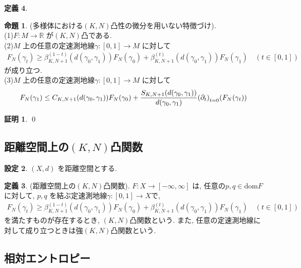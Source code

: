 \documentclass[10pt, fleqn, label-section=none]{bxjsarticle}
\theoremstyle{definition}
\newtheorem{dfn}{定義}[section]
\newtheorem{prop}[dfn]{命題}
\newtheorem{setting}[dfn]{設定}
\newtheorem*{pf*}{証明}
\newcommand{\paren}[1]{\mleft( #1\mright )}
\newcommand{\dom}{\textrm{dom}}
\renewcommand{\;}{\, ; \,}
\begin{document}
\begin{dfn}
\begin{prop}(多様体における$(K, N)$凸性の微分を用いない特徴づけ). \\
(1)$F: M \rightarrow \mathbb R$ が$(K,N)$凸である. \\
(2)$M$ 上の任意の定速測地線$\gamma : [0,1] \rightarrow M$ に対して
\begin{align*}  F_N(\gamma_t) \geq \beta_{K,N+1}^{(1-t)}(d(\gamma_0, \gamma_1) )F_N(\gamma_0) + \beta_{K,N+1}^{(t)} (d(\gamma_0, \gamma_1)) F_N (\gamma_1) \quad (t \in [0,1])\end{align*}
が成り立つ. \\
(3)$M$ 上の任意の定速測地線$\gamma : [0,1] \rightarrow M$ に対して
\begin{align*} F_N (\gamma_1) \leq C_{K,N+1}(d(\gamma_0, \gamma_1) ) F_N(\gamma_0) + \frac{S_{K,N+1}(d(\gamma_0, \gamma_1))}{d(\gamma_0, \gamma_1)} \paren{\partial_t}_{t = 0}  \paren{ F_N(\gamma_t)  }  \end{align*}
\end{prop}
\begin{pf*}

\qed
\end{pf*}

\subsection{距離空間上の$(K,N)$凸関数}

\begin{setting}
$(X, d)$ を距離空間とする. 
\end{setting}

\begin{dfn}(距離空間上の$(K,N)$凸関数). $F: X \rightarrow [-\infty, \infty]$ は, 任意の$p, q \in \dom F$ に対して, $p, q$ を結ぶ定速測地線$\gamma : [0,1] \rightarrow X $で, 
\begin{align*}  F_N(\gamma_t) \geq \beta_{K,N+1}^{(1-t)}(d(\gamma_0, \gamma_1) )F_N(\gamma_0) + \beta_{K,N+1}^{(t)} (d(\gamma_0, \gamma_1)) F_N (\gamma_1) \quad (t \in [0,1])\end{align*}
を満たすものが存在するとき, $(K,N)$凸関数という. また, 任意の定速測地線に対して成り立つときは強$(K,N)$凸関数という. 
\end{dfn}



\subsection{相対エントロピー}


\end{dfn}
\end{document}
